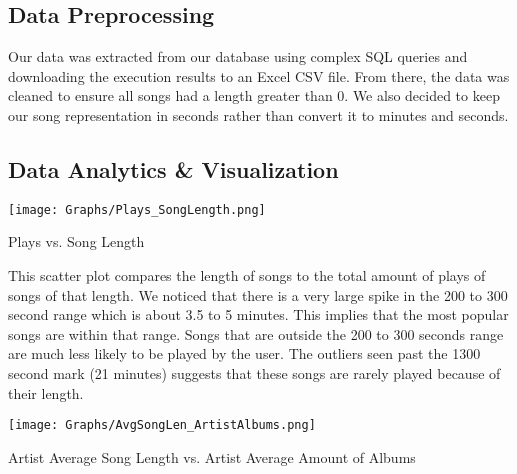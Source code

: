 \documentclass[12pt]{article}
\begin{document}
    \subsection{Data Preprocessing}
    Our data was extracted from our database using complex SQL queries and downloading
    the execution results to an Excel CSV file. From there, the data was cleaned to ensure
    all songs had a length greater than 0. We also decided to keep our song representation in
    seconds rather than convert it to minutes and seconds.



    \subsection{Data Analytics \& Visualization}

    \begin{center}
        \texttt{[image: Graphs/Plays\_SongLength.png]}
    \end{center}
    \caption{Plays vs. Song Length}
    \label{Plays vs. Song Length}

    \vspace{0.5cm}

    \noindent This scatter plot compares the length of songs to the total amount of plays of
    songs of that length. We noticed that there is a very large spike in the 200 to 300
    second range which is about 3.5 to 5 minutes. This implies that the most
    popular songs are within that range. Songs that are outside the 200 to 300 seconds
    range are much less likely to be played by the user. The outliers seen past the 1300
    second mark (21 minutes) suggests that these songs are rarely played because of their
    length.

    \begin{center}
        \texttt{[image: Graphs/AvgSongLen\_ArtistAlbums.png]}
    \end{center}
    \caption{Artist Average Song Length vs. Artist Average Amount of Albums}
    \label{Artist Avg Song Len vs. Artist Avg Amt of Albums}
\end{document}

